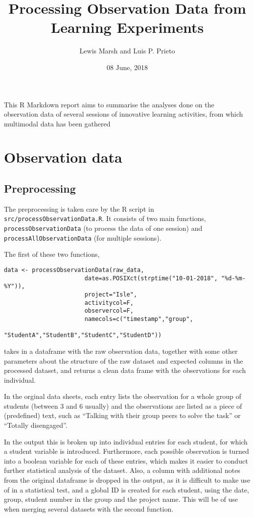\documentclass[]{article}
\title{Processing Observation Data from Learning Experiments}
\author{Lewis Marsh and Luis P. Prieto}
\date{08 June, 2018}
\begin{document}
\maketitle

This R Markdown report aims to summarise the analyses done on the
observation data of several sessions of innovative learning activities,
from which multimodal data has been gathered

\section{Observation data}\label{observation-data}

\subsection{Preprocessing}\label{preprocessing}

The preprocessing is taken care by the R script in
\texttt{src/processObservationData.R}. It consists of two main
functions, \texttt{processObservationData} (to process the data of one
session) and \texttt{processAllObservationData} (for multiple sessions).

The first of these two functions,

\begin{verbatim}
data <- processObservationData(raw_data,
                       date=as.POSIXct(strptime("10-01-2018", "%d-%m-%Y")),
                       project="Isle", 
                       activitycol=F,
                       observercol=F,
                       namecols=c("timestamp","group",
                            "StudentA","StudentB","StudentC","StudentD"))
\end{verbatim}

takes in a dataframe with the raw observation data, together with some
other parameters about the structure of the raw dataset and expected
columns in the processed dataset, and returns a clean data frame with
the observations for each individual.

In the orginal data sheets, each entry lists the observation for a whole
group of students (between 3 and 6 usually) and the observations are
listed as a piece of (predefined) text, such as ``Talking with their
group peers to solve the task'' or ``Totally disengaged''.

In the output this is broken up into individual entries for each
student, for which a student variable is introduced. Furthermore, each
possible observation is turned into a boolean variable for each of these
entries, which makes it easier to conduct further statistical analysis
of the dataset. Also, a column with additional notes from the original
dataframe is dropped in the output, as it is difficult to make use of in
a statistical test, and a global ID is created for each student, using
the date, group, student number in the group and the project name. This
will be of use when merging several datasets with the second function.
\end{document}
